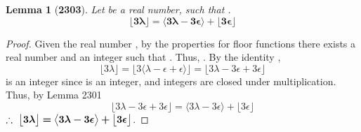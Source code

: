 \documentclass[preview]{standalone}
\newtheorem*{lemma*}{Lemma}
\begin{document}
\begin{lemma*}[\textbf{2303}]
    Let \bm{$\lambda$} be a real number, 
    such that \bm{$\big \lfloor \lambda \big \rfloor + \epsilon = \lambda$}.
    \begin{equation*}
        \bm{
            \big \lfloor 3 \lambda \big \rfloor 
                =
            \big \langle 
                3 \lambda - 3 \epsilon 
            \big \rangle
                +
            \big \lfloor 3 \epsilon \big \rfloor 
        }
    \end{equation*}
\end{lemma*}

\begin{proof}
    Given the real number \bm{$\lambda$}, 
    by the properties for floor functions
    there exists a real number \bm{$\epsilon$}
    and an integer \bm{$\lambda - \epsilon$} such that 
    \bm{$\lfloor \lambda \rfloor = \lambda - \epsilon$}.
    Thus, \bm{$\lambda = \lambda - \epsilon + \epsilon$}.
    By the identity \bm{$\lambda$},
    \begin{equation*}
        \Big \lfloor 3 \lambda \Big \rfloor 
            =
        \Big \lfloor 
                3 
                \big \langle 
                    \lambda - \epsilon + \epsilon 
                \big \rangle 
        \Big \rfloor
            =
        \Big \lfloor 
            3 \lambda - 3 \epsilon + 3 \epsilon 
        \Big \rfloor
    \end{equation*}
    \bm{$3 \lambda - 3 \epsilon$} is an integer 
    since \bm{$\lambda - \epsilon$} is an integer, 
    and integers are closed under multiplication.
    Thus, by Lemma 2301
    \begin{equation*} 
        \Big \lfloor 
                3 \lambda - 3 \epsilon + 3 \epsilon 
        \Big \rfloor
            =
        \Big \langle 3 \lambda - 3 \epsilon \Big \rangle
            + 
        \Big \lfloor            
            3 \epsilon 
        \Big \rfloor
    \end{equation*}
    $\therefore \text{\space} \bm{
        \big \lfloor 3 \lambda \big \rfloor 
            =
        \big \langle 
            3 \lambda - 3 \epsilon 
        \big \rangle
            +
        \big \lfloor 3 \epsilon \big \rfloor
    }$.
\color{lightgray} \end{proof}
\end{document}
